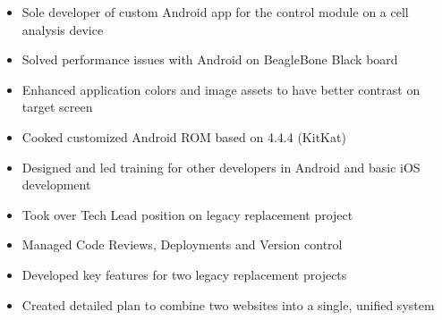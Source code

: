 \documentclass[12pt,letterpaper,sans]{moderncv}
\begin{document}
	\begin{itemize}[leftmargin=1.24in]
		\item Sole developer of custom Android app for the control module on a cell analysis device
		\item Solved performance issues with Android on BeagleBone Black board
		\item Enhanced application colors and image assets to have better contrast on target screen
		\item Cooked customized Android ROM based on 4.4.4 (KitKat)
		\item Designed and led training for other developers in Android and basic iOS development
	\end{itemize}
	\begin{itemize}[leftmargin=1.24in]
		\item Took over Tech Lead position on legacy replacement project
		\item Managed Code Reviews, Deployments and Version control
		\item Developed key features for two legacy replacement projects
		\item Created detailed plan to combine two websites into a single, unified system
	\end{itemize} 
\end{document}
